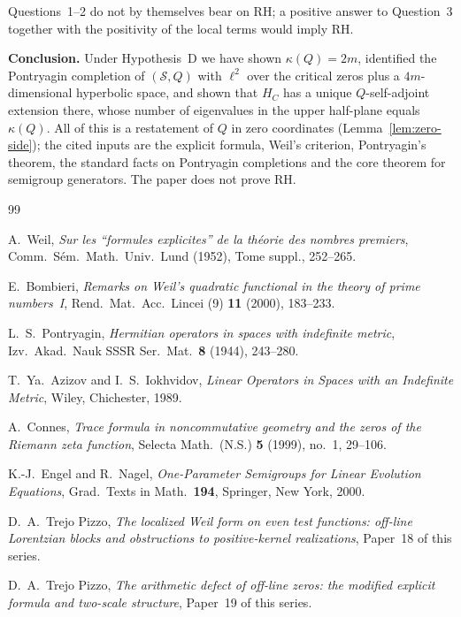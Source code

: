 \documentclass[11pt]{amsart}
\newcommand{\kap}{\kappa}
\newcommand{\Scal}{\mathcal{S}}
\begin{document}
\medskip
Questions~1--2 do not by themselves bear on RH; a positive answer to Question~3 together with
the positivity of the local terms would imply RH.

\medskip
\textbf{Conclusion.}  Under Hypothesis~D we have shown $\kap(Q)=2m$, identified the Pontryagin
completion of $(\Scal,Q)$ with $\ell^2$ over the critical zeros plus a $4m$-dimensional
hyperbolic space, and shown that $H_C$ has a unique $Q$-self-adjoint extension there, whose number of
eigenvalues in the upper half-plane equals $\kap(Q)$.  All of this is a restatement of $Q$ in
zero coordinates (Lemma~\ref{lem:zero-side}); the cited inputs are the explicit formula, Weil's
criterion, Pontryagin's theorem, the standard facts on Pontryagin completions and the core
theorem for semigroup generators.  The paper does not prove RH.

\begin{thebibliography}{99}

A.~Weil,
\textit{Sur les ``formules explicites'' de la th\'eorie des nombres premiers},
Comm.~S\'em.\ Math.\ Univ.\ Lund (1952), Tome suppl., 252--265.

E.~Bombieri,
\textit{Remarks on Weil's quadratic functional in the theory of prime numbers~I},
Rend.\ Mat.\ Acc.\ Lincei (9) \textbf{11} (2000), 183--233.

L.~S.~Pontryagin,
\textit{Hermitian operators in spaces with indefinite metric},
Izv.\ Akad.\ Nauk SSSR Ser.\ Mat.\ \textbf{8} (1944), 243--280.

T.~Ya.~Azizov and I.~S.~Iokhvidov,
\textit{Linear Operators in Spaces with an Indefinite Metric},
Wiley, Chichester, 1989.

A.~Connes,
\textit{Trace formula in noncommutative geometry and the zeros of the Riemann zeta function},
Selecta Math.\ (N.S.) \textbf{5} (1999), no.~1, 29--106.

K.-J.~Engel and R.~Nagel,
\textit{One-Parameter Semigroups for Linear Evolution Equations},
Grad.\ Texts in Math.\ \textbf{194}, Springer, New York, 2000.

D.~A.~Trejo Pizzo,
\textit{The localized Weil form on even test functions: off-line Lorentzian blocks and
obstructions to positive-kernel realizations}, Paper~18 of this series.

D.~A.~Trejo Pizzo,
\textit{The arithmetic defect of off-line zeros: the modified explicit formula and two-scale
structure}, Paper~19 of this series.

\end{thebibliography}
\end{document}
